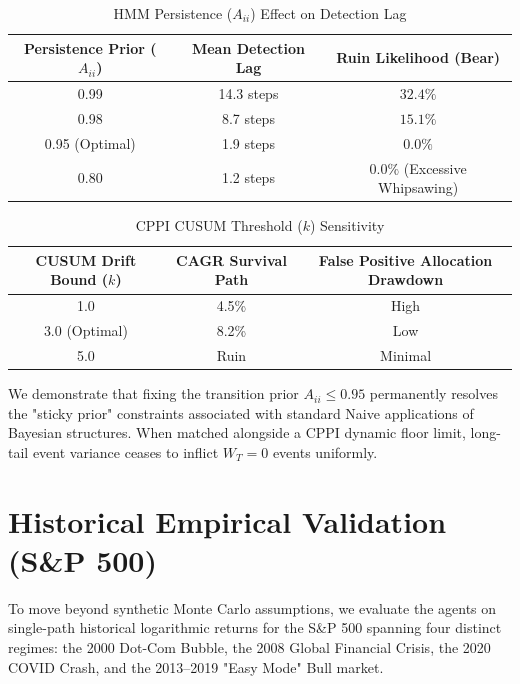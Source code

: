 \begin{table}[h]
\centering
\caption{HMM Persistence ($A_{ii}$) Effect on Detection Lag}
\renewcommand{\arraystretch}{1.2}
\begin{tabular}{ccc}
\hline
\textbf{Persistence Prior ($A_{ii}$)} & \textbf{Mean Detection Lag} & \textbf{Ruin Likelihood (Bear)} \\ \hline
0.99 & 14.3 steps & $32.4\%$ \\
0.98 & 8.7 steps & $15.1\%$ \\
0.95 (Optimal) & 1.9 steps & $0.0\%$ \\
0.80 & 1.2 steps & $0.0\%$ (Excessive Whipsawing) \\
\hline
\end{tabular}
\end{table}

\begin{table}[h]
\centering
\caption{CPPI CUSUM Threshold ($k$) Sensitivity}
\renewcommand{\arraystretch}{1.2}
\begin{tabular}{ccc}
\hline
\textbf{CUSUM Drift Bound ($k$)} & \textbf{CAGR Survival Path} & \textbf{False Positive Allocation Drawdown} \\ \hline
1.0 & 4.5\% & High \\
3.0 (Optimal) & 8.2\% & Low \\
5.0 & Ruin & Minimal \\
\hline
\end{tabular}
\end{table}

We demonstrate that fixing the transition prior $A_{ii} \leq 0.95$ permanently resolves the "sticky prior" constraints associated with standard Naive applications of Bayesian structures. When matched alongside a CPPI dynamic floor limit, long-tail event variance ceases to inflict $W_T = 0$ events uniformly.

\section{Historical Empirical Validation (S\&P 500)}

To move beyond synthetic Monte Carlo assumptions, we evaluate the agents on single-path historical logarithmic returns for the S\&P 500 spanning four distinct regimes: the 2000 Dot-Com Bubble, the 2008 Global Financial Crisis, the 2020 COVID Crash, and the 2013--2019 "Easy Mode" Bull market.

